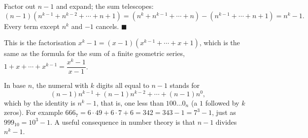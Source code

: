 Factor out $n-1$ and expand; the sum telescopes:
\[
(n-1)\left(n^{k-1}+n^{k-2}+\cdots+n+1\right)=\left(n^{k}+n^{k-1}+\cdots+n\right)-\left(n^{k-1}+\cdots+n+1\right)=n^k-1 .
\]
Every term except $n^k$ and $-1$ cancels. $\blacksquare$

This is the factorisation $x^k-1=(x-1)\left(x^{k-1}+\cdots+x+1\right)$, which is the same as the formula for the sum of a finite geometric series, $1+x+\cdots+x^{k-1}=\dfrac{x^k-1}{x-1}$.

In base $n$, the numeral with $k$ digits all equal to $n-1$ stands for
\[
(n-1)n^{k-1}+(n-1)n^{k-2}+\cdots+(n-1)n^0 ,
\]
which by the identity is $n^k-1$, that is, one less than $100\ldots0_n$ (a $1$ followed by $k$ zeros). For example $666_7=6\cdot49+6\cdot7+6=342=343-1=7^3-1$, just as $999_{10}=10^3-1$. A useful consequence in number theory is that $n-1$ divides $n^k-1$.

